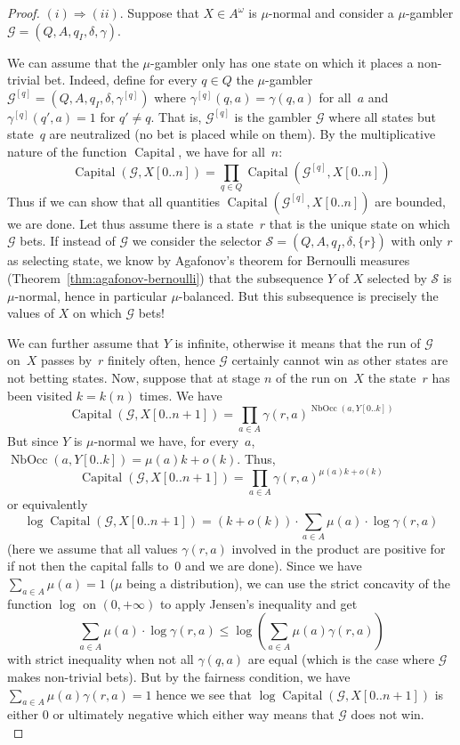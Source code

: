 \documentclass[11pt]{article}
\renewcommand{\S}{\mathcal{S}}
\newcommand{\G}{\mathcal{G}}
\DeclareMathOperator{\nbocc}{NbOcc}
\DeclareMathOperator{\capital}{Capital}
\begin{document}
\begin{proof}
$(i) \Rightarrow (ii)$. Suppose that $X \in A^\omega$ is $\mu$-normal and consider a $\mu$-gambler $\G=(Q,A,q_I,\delta,\gamma)$. 

We can assume that the $\mu$-gambler only has one state on which it places a non-trivial bet. Indeed, define for every $q \in Q$ the $\mu$-gambler $\G^{[q]}=(Q,A,q_I,\delta,\gamma^{[q]})$ where $\gamma^{[q]}(q,a)=\gamma(q,a)$ for all~$a$ and $\gamma^{[q]}(q',a)=1$ for $q' \not = q$. That is, $\G^{[q]}$ is the gambler $\G$ where all states but state~$q$ are neutralized (no bet is placed while on them). By the multiplicative nature of the function $\capital$, we have for all~$n$:
\[
\capital(\G,X[0..n]) = \prod_{q \in Q} \capital(\G^{[q]},X[0..n])
\]
Thus if we can show that all quantities $\capital(\G^{[q]},X[0..n])$ are bounded, we are done. Let thus assume there is a state~$r$ that is the unique state on which $\G$ bets. If instead of $\G$ we consider the selector $\S=(Q,A,q_I,\delta,\{r\})$ with only $r$ as selecting state, we know by Agafonov's theorem for Bernoulli measures (Theorem~\ref{thm:agafonov-bernoulli}) that the subsequence $Y$ of $X$ selected by $\S$ is $\mu$-normal, hence in particular $\mu$-balanced. But this subsequence is precisely the values of $X$ on which $\G$ bets! 

We can further assume that $Y$ is infinite, otherwise it means that the run of $\G$ on~$X$ passes by~$r$ finitely often, hence $\G$ certainly cannot win as other states are not betting states. Now, suppose that at stage $n$ of the run on~$X$ the state~$r$ has been visited $k=k(n)$ times. We have 
\[
\capital(\G,X[0..n+1]) = \prod_{a \in A} \gamma(r,a)^{\nbocc(a,Y[0..k])}
\] 
But since $Y$ is $\mu$-normal we have, for every~$a$, $\nbocc(a,Y[0..k]) = \mu(a)k + o(k)$. Thus,
\[
\capital(\G,X[0..n+1]) = \prod_{a \in A} \gamma(r,a)^{\mu(a)k + o(k)}
\] 
or equivalently 
\[
\log \capital(\G,X[0..n+1]) = (k+o(k)) \cdot \sum_{a \in A} \mu(a)\cdot  \log \gamma(r,a) 
\] 
(here we assume that all values $\gamma(r,a)$ involved in the product are positive for if not then the capital falls to~$0$ and we are done). Since we have  $\sum_{a \in A} \mu(a)=1$ ($\mu$ being a distribution), we can use the strict concavity of the function $\log$ on $(0,+\infty)$ to apply Jensen's inequality and get 
\[
\sum_{a \in A} \mu(a)\cdot  \log \gamma(r,a) \leq \log \left( \sum_{a \in A} \mu(a) \gamma(r,a)\right)
\]
with strict inequality when not all $\gamma(q,a)$ are equal (which is the case where $\G$ makes non-trivial bets). But by the fairness condition, we have $\sum_{a \in A} \mu(a) \gamma(r,a)=1$ hence we see that $\log \capital(\G,X[0..n+1])$ is either $0$ or ultimately negative which either way means that $\G$ does not win. \\


\end{proof}
\end{document}
